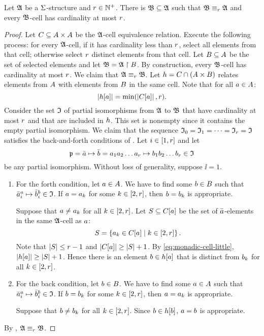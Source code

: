\begin{lemma}\label{lem:monadic-cell}
Let $\mathfrak{A}$ be a $\mathrm{\Sigma}$-structure and $r \in \mathbb{N}^{+}$.
There is $\mathfrak{B} \subseteq \mathfrak{A}$ such that
$\mathfrak{B} \equiv_{r} \mathfrak{A}$ and every $\mathfrak{B}$-cell has cardinality at most $r$.
\end{lemma}
\begin{proof}
Let $C \subseteq {A\times A}$ be the $\mathfrak{A}$-cell equivalence relation.
Execute the following process: for every $\mathfrak{A}$-cell, if it has cardinality
less than $r$, select all elements from that cell;
otherwise select $r$ distinct elements from that cell.
Let $B \subseteq A$ be the set of selected elements and let
$\mathfrak{B} = \mathfrak{A} \restriction B$.
By construction, every $\mathfrak{B}$-cell has cardinality at most $r$.
We claim that $\mathfrak{A} \equiv_{r} \mathfrak{B}$.
Let $h = C \cap (A \times B)$ relates elements from $A$ with
elements from $B$ in the same cell.
Note that for all $a \in A$:
\begin{equation}\label{eq:monadic-cell-little}
  \left|h[a]\right| = \min(\left|C[a]\right|, r).
\end{equation}
Consider the set $\mathfrak{I}$ of partial isomorphisms from $\mathfrak{A}$ to $\mathfrak{B}$ that
have cardinality at most $r$ and that are included in $h$.
This set is nonempty since it contains the empty partial isomorphism.
We claim that the sequence $\mathfrak{I}_{0} = \mathfrak{I}_{1} = \dots = \mathfrak{I}_{r} = \mathfrak{I}$
satisfies the back-and-forth conditions of .
Let $i \in [1,r]$ and let 
\[
  \mathfrak{p} = \bar{a} \mapsto \bar{b} =
  a_{1}a_{2}\dots a_{r} \mapsto b_{1}b_{2}\dots b_{r} \in \mathfrak{I}
\]
be any partial isomorphism.
Without loss of generality, suppose $\ii = 1$.
\begin{enumerate}
  \item For the forth condition, let $a \in A$.
  We have to find some $b \in B$ such that
  $\bar{a}_{i}^{a} \mapsto \bar{b}_{i}^{b} \in \mathfrak{I}$.
  If $a = a_{k}$ for some $k \in [2,r]$, then $b = b_{k}$ is
  appropriate.
  
  Suppose that $a \neq a_{k}$ for all $k \in [2,r]$.
  Let $S \subseteq C[a]$ be the set of $\bar{a}$-elements in the same
  $\mathfrak{A}$-cell as $a$:
  \[
    S = \left\{a_{k} \in C[a]\mathrel{}\middle|\mathrel{}k \in [2,r]\right\}.
  \]
  Note that $\left|S\right| \leq r-1$ and
  $\left|C[a]\right| \geq \left|S\right| + 1$.
  By \cref{eq:monadic-cell-little}, $\left|h[a]\right| \geq \left|S\right| + 1$.
  Hence there is an element $b \in h[a]$ that is distinct from
  $b_{k}$ for all $k \in [2,r]$.
  \item For the back condition, let $b \in B$.
  We have to find some $a \in A$ such that
  $\bar{a}_{i}^{a} \mapsto \bar{b}_{i}^{b} \in \mathfrak{I}$.
  If $b = b_{k}$ for some $k \in [2,r]$, then $a = a_{k}$ is
  appropriate.
  
  Suppose that $b \neq b_{k}$ for all $k \in [2,r]$. Since $b \in
  h[b]$, $a = b$ is appropriate.
\end{enumerate}
By , $\mathfrak{A} \equiv_{r} \mathfrak{B}$.
\end{proof}